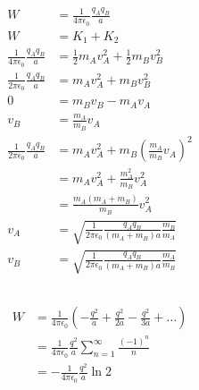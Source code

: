 \documentclass{article}
\newcommand{\ke}{\frac{1}{4 \pi \epsilon_0}}
\begin{document}
\begin{align*}
  W                                            & = \ke \frac{q_A q_B}{a}                                                           \\
  W                                            & = K_1 + K_2                                                                       \\
  \ke \frac{q_A q_B}{a}                        & = \frac{1}{2} m_A v_A^2 + \frac{1}{2} m_B v_B^2                                   \\
  \frac{1}{2 \pi \epsilon_0} \frac{q_A q_B}{a} & = m_A v_A^2 + m_B v_B^2                                                           \\
  0                                            & = m_B v_B - m_A v_A                                                               \\
  v_B                                          & = \frac{m_A}{m_B} v_A                                                             \\
  \frac{1}{2 \pi \epsilon_0} \frac{q_A q_B}{a} & = m_A v_A^2 + m_B \left( \frac{m_A}{m_B} v_A \right)^2                            \\
                                               & = m_A v_A^2 + \frac{m_A^2}{m_B} v_A^2                                             \\
                                               & = \frac{m_A (m_A + m_B)}{m_B} v_A^2                                               \\
  v_A                                          & = \sqrt{\frac{1}{2 \pi \epsilon_0} \frac{q_A q_B}{(m_A + m_B) a} \frac{m_B}{m_A}} \\
  v_B                                          & = \sqrt{\frac{1}{2 \pi \epsilon_0} \frac{q_A q_B}{(m_A + m_B) a} \frac{m_A}{m_B}}
\end{align*}

\subsection{}

\begin{align*}
  W & = \ke \left( -\frac{q^2}{a} + \frac{q^2}{2 a} - \frac{q^2}{3 a} + \ldots \right) \\
    & = \ke \frac{q^2}{a} \sum_{n = 1}^\infty \frac{(-1)^n}{n}                         \\
    & = -\ke \frac{q^2}{a} \ln 2
\end{align*}
\end{document}
